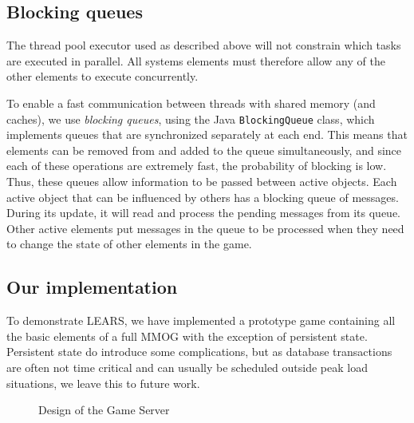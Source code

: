 \subsection{Blocking queues}

The thread pool executor used as described above will not constrain
which tasks are executed in parallel. All systems elements
must therefore allow any of the other elements to execute concurrently. 

To enable a fast communication between threads with shared memory (and
caches), we use \textit{blocking queues}, using the Java
\texttt{Blocking\-Queue} class, which implements queues that are
synchronized separately at each end. This means that elements can be
removed from and added to the queue simultaneously, and since each of
these operations are extremely fast, the probability of blocking is
low.
%
Thus, these queues allow information to be passed
between active objects. Each active object that can be influenced by
others has a blocking queue of messages. During its update, it will
read and process the pending messages from its queue. Other active
elements put messages in the queue to be processed when they need to
change the state of other elements in the game.

\vspace{4mm}
\subsection{Our implementation}
 
To demonstrate LEARS, we have implemented a prototype
game containing all the basic elements of a full MMOG with the
exception of persistent state.
%
Persistent state do introduce some complications, but as database
transactions are often not time critical and can usually be scheduled
outside peak load situations, we leave this to future work.

\begin{figure}
\centering
\vspace{-3mm}
\caption{Design of the Game Server}
\vspace{-3mm}
\label{fig:server}
\end{figure}


